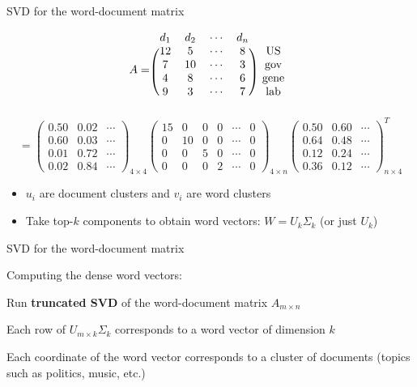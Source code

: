 \documentclass[usenames,dvipsnames,notes,11pt,aspectratio=169]{beamer}
\begin{document}
\begin{frame}
    {SVD for the word-document matrix}

    \[
        A=
        \begin{blockarray}{ccccc}
            d_1 & d_2 & \cdots & d_n & \\
\begin{block}{(cccc)c}
  12 & 5   & \cdots & 8 & \text{US} \\
  7  & 10  & \cdots & 3 & \text{gov} \\
  4  & 8   & \cdots & 6 & \text{gene} \\
  9  & 3   & \cdots & 7 & \text{lab} \\
\end{block}
\end{blockarray}
    \]
    \pause
    \[
    =
        \begin{pmatrix}
0.50 & 0.02 & \cdots \\
0.60 & 0.03 & \cdots \\
0.01 & 0.72 & \cdots \\
0.02 & 0.84 & \cdots
\end{pmatrix}_{4 \times 4}
\begin{pmatrix}
15 & 0  & 0  & 0  & \cdots & 0 \\
0  & 10 & 0  & 0  & \cdots & 0 \\
0  & 0  & 5  & 0  & \cdots & 0 \\
0  & 0  & 0  & 2  & \cdots & 0
\end{pmatrix}_{4 \times n}
\begin{pmatrix}
0.50 & 0.60 & \cdots  \\
0.64 & 0.48 & \cdots  \\
0.12 & 0.24 & \cdots  \\
0.36 & 0.12 & \cdots 
\end{pmatrix}_{n \times 4}^T
\]

\pause
    \begin{itemize}
        \item $u_i$ are document clusters and $v_i$ are word clusters
        \item Take top-$k$ components to obtain word vectors: $W=U_k\Sigma_k$ (or just $U_k$)
    \end{itemize}
\end{frame}

\begin{frame}
    {SVD for the word-document matrix}

    Computing the dense word vectors:
    \begin{wideitemize}
        \item Run {\bf truncated SVD} of the word-document matrix $A_{m\times n}$
        \item Each row of $U_{m\times k}\Sigma_k$ corresponds to a word vector of dimension $k$
        \item Each coordinate of the word vector corresponds to a cluster of documents (\ie topics such as politics, music, etc.)
    \end{wideitemize}
\end{frame}
\end{document}
